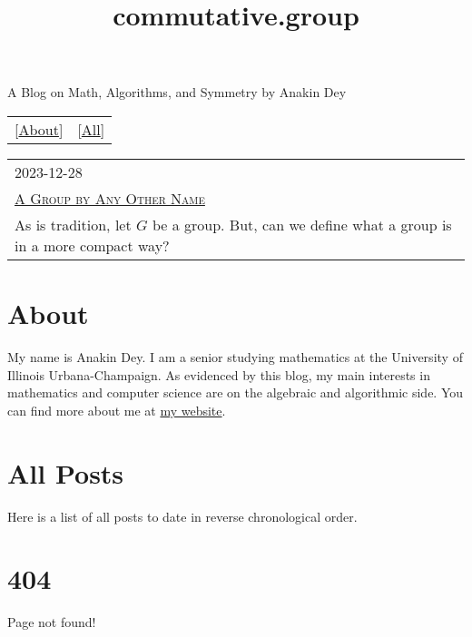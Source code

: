 \documentclass{article}
\title{commutative.group}
\begin{document}
\maketitle
\newline
\begin{center}
  A Blog on Math, Algorithms, and Symmetry by Anakin Dey
\end{center}
\begin{table}
  \centering
  \begin{tabular}{cc}
    \LARGE[\href{About.html}{About}] & \LARGE[\href{All-Posts.html}{All}]
  \end{tabular}
\end{table}

\begin{table}
  \centering
  \begin{tabular}{|l|}
    \hline
    \large 2023-12-28 \\
    \LARGE \href{posts/other_name.html}{\textsc{A Group by Any Other Name}} \\
    As is tradition, let $G$ be a group. But, can we define what a group is in a more compact way? \\
    \hline
  \end{tabular}
\end{table}

\part*{\centering About}

\newline

My name is Anakin Dey.
I am a senior studying mathematics at the University of Illinois Urbana-Champaign.
As evidenced by this blog, my main interests in mathematics and computer science are on the algebraic and algorithmic side.
You can find more about me at \href{https://www.anakin-dey.com/}{my website}.

\part*{\centering All Posts}

\newline

Here is a list of all posts to date in reverse chronological order.

\part*{404}

\newline

Page not found!
\end{document}
